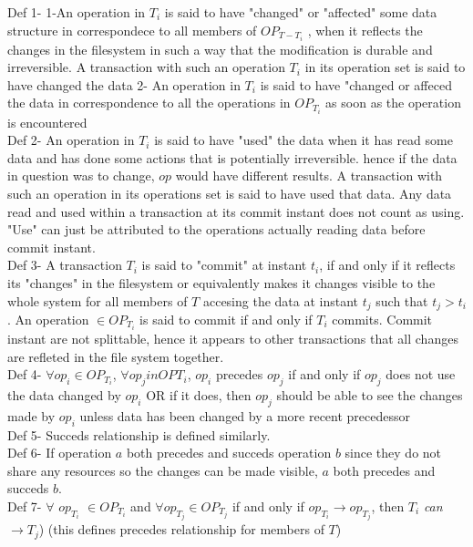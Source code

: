 \documentclass[a4paper, 11pt]{article}
\begin{document}
Def 1- 1-An operation in $T_i$ is said to have "changed" or "affected" some data structure in correspondece to all members of $OP_{T- T_i}$ , when it reflects the changes in the filesystem in such a way that the modification is durable and irreversible. A transaction with such an operation $T_i$ in its operation set is said to have changed the data 2- An operation in $T_i$ is said to have "changed or affeced the data in correspondence to all the operations in $OP_{T_i}$ as soon as the operation is encountered \\

Def 2- An operation in $T_i$ is said to have "used" the data when it has read some data and has done some actions that is potentially irreversible. hence if the data in question was to change, $op$ would have different results. A transaction with such an operation in its operations set is said to have used that data. Any data read and used within a transaction at its commit instant does not count as using. "Use" can just be attributed to the operations actually reading data before commit instant. \\   

Def 3- A transaction $T_i$ is said to "commit" at instant $t_i$, if and only if it reflects its "changes" in the filesystem or equivalently makes it changes visible to the whole system for all members of $T$ accesing the data at instant $t_j$ such that $t_j > t_i$ . An operation $\in OP_{T_i}$ is said to commit if and only if $T_i$ commits. Commit instant are not splittable, hence it appears to other transactions that all changes are refleted in the file system together.\\ 

Def 4-  $\forall op_i \in OP_{T_i}$, $\forall op_j in OP{T_i}$, $op_i$ precedes $op_j$ if and only if $op_j$ does not use the data changed by $op_i$ OR if it does, then $op_j$ should be able to see the changes made by $op_i$ unless data has been changed by a more recent precedessor  \\ 

Def 5- Succeds relationship is defined similarly.  \\

Def 6- If operation $a$ both precedes and succeds operation $b$ since they do not share any resources so the changes can be made visible, $a$ both precedes and succeds $b$. \\ 

Def 7- $\forall$ $op_{T_i}$ $\in OP_{T_i}$ and $\forall op_{T_j}\in OP_{T_j}$ if and only if $op_{T_i} \rightarrow op_{T_j}$,  then $T_i$ \emph {can} $\rightarrow T_j$) \hspace{8mm} (this defines precedes relationship for members of $T$) \\
\end{document}
